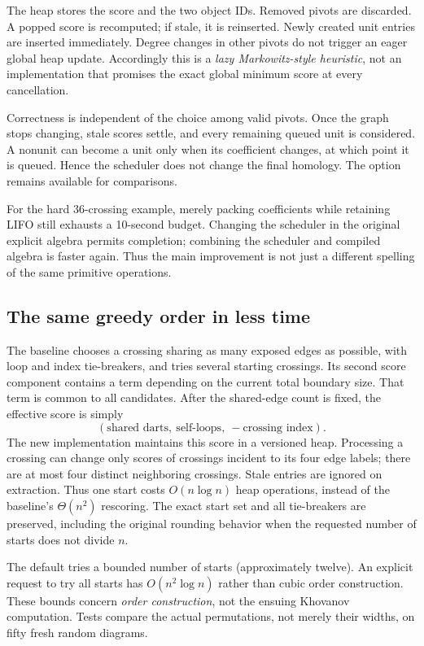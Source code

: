 \documentclass[11pt]{article}
\newcommand{\code}[1]{\texttt{\detokenize{#1}}}
\begin{document}
The heap stores the score and the two object IDs. Removed pivots are discarded.
A popped score is recomputed; if stale, it is reinserted. Newly created unit
entries are inserted immediately. Degree changes in other pivots do not
trigger an eager global heap update. Accordingly this is a \emph{lazy
Markowitz-style heuristic}, not an implementation that promises the exact
global minimum score at every cancellation.

Correctness is independent of the choice among valid pivots. Once the graph
stops changing, stale scores settle, and every remaining queued unit is
considered. A nonunit can become a unit only when its coefficient changes, at
which point it is queued. Hence the scheduler does not change the final
homology. The \code{lifo} option remains available for comparisons.

For the hard 36-crossing example, merely packing coefficients while retaining
LIFO still exhausts a 10-second budget. Changing the scheduler in the original
explicit algebra permits completion; combining the scheduler and compiled
algebra is faster again. Thus the main improvement is not just a different
spelling of the same primitive operations.

\subsection{The same greedy order in less time}

The baseline chooses a crossing sharing as many exposed edges as possible,
with loop and index tie-breakers, and tries several starting crossings. Its
second score component contains a term depending on the current total boundary
size. That term is common to all candidates. After the shared-edge count is
fixed, the effective score is simply
\[
 (\text{shared darts},\ \text{self-loops},\ -\text{crossing index}).
\]
The new implementation maintains this score in a versioned heap. Processing a
crossing can change only scores of crossings incident to its four edge labels;
there are at most four distinct neighboring crossings. Stale entries are
ignored on extraction. Thus one start costs $O(n\log n)$ heap operations,
instead of the baseline's $\Theta(n^2)$ rescoring. The exact start set and all
tie-breakers are preserved, including the original rounding behavior when the
requested number of starts does not divide $n$.

The default tries a bounded number of starts (approximately twelve). An
explicit request to try all starts has $O(n^2\log n)$ rather than cubic order
construction. These bounds concern \emph{order construction}, not the ensuing
Khovanov computation. Tests compare the actual permutations, not merely their
widths, on fifty fresh random diagrams.
\end{document}
